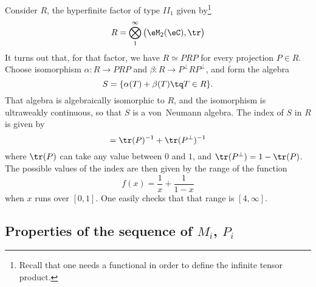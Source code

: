 Consider $R$, the hyperfinite factor of type $II_1$ given by\footnote{Recall that one needs a functional in order to define the infinite tensor product.}
\begin{equation}
	R=\bigotimes_1^{\infty}\big( \eM_2(\eC),\tr \big)
\end{equation}
It turns out that, for that factor, we have $R\simeq PRP$ for every projection $P\in R$. Choose isomorphism $\alpha\colon R\to PRP$ and $\beta\colon R\to P^{\perp}RP^{\perp}$, and form the algebra
\begin{equation}
	S=\{ \alpha(T)+\beta(T)\tq T\in R \}.
\end{equation}
That algebra is algebraically isomorphic to $R$, and the isomorphism is ultraweakly continuous, so that $S$ is a von~Neumann algebra. The index of $S$ in $R$ is given by
\begin{equation}
	[R:S]=\tr(P)^{-1}+\tr(P^{\perp})^{-1}
\end{equation}
where $\tr(P)$ can take any value between $0$ and $1$, and $\tr(P^{\perp})=1-\tr(P)$. The possible values of the index are then given by the range of the function
\begin{equation}
	f(x)=\frac{1}{ x }+\frac{1}{ 1-x }
\end{equation}
when $x$ runs over $[0,1]$. One easily checks that that range is $[4,\infty]$.


					\subsection{Properties of the sequence of \texorpdfstring{$M_i$}{Mi}, \texorpdfstring{$P_i$}{Pi}}		\label{SubSecPropSeqMO}

